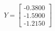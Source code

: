 

\[
Y = \left[ \begin{array}{c} \mbox{-0.3800} \\ \mbox{-1.5900} \\ \mbox{-1.2150} \end{array} \right]
\]


